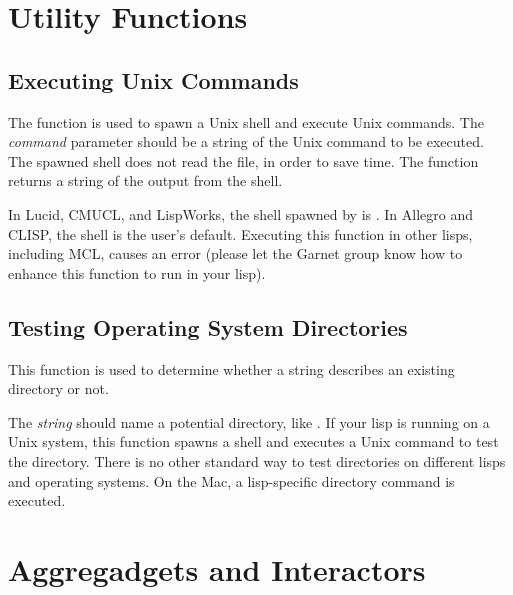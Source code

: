 \chapter{Utility Functions}

\begin{group}
\section{Executing Unix Commands}
 


The function  is used to spawn a Unix shell and
execute Unix commands.  The {\it command} parameter should be a string of the
Unix command to be executed.  The spawned shell does not read the 
file, in order to save time.  The function returns a string of the output
from the shell.

In Lucid, CMUCL, and LispWorks, the shell spawned by 
is .  In Allegro and CLISP, the shell is the user's default.
Executing this function in other lisps, including MCL, causes an error
(please let the Garnet group know how to enhance this function to run in
your lisp).
\end{group}


\begin{group}
\section{Testing Operating System Directories}

This function is used to determine whether a string describes an
existing directory or not.


The {\it string} should name a potential directory, like .
If your lisp is running on a Unix system, this function spawns a shell and
executes a Unix command to test the directory.
There is no other standard way to test directories on different
lisps and operating systems.  On the Mac, a lisp-specific directory command
is executed.
\end{group}




\chapter{Aggregadgets and Interactors}

